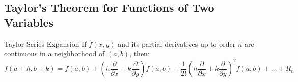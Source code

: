 \documentclass[11pt,a4paper]{article}
\begin{document}
\subsection{Taylor's Theorem for Functions of Two Variables}

\begin{defbox}{Taylor Series Expansion}
If $f(x,y)$ and its partial derivatives up to order $n$ are continuous in a neighborhood of $(a,b)$, then:
\begin{equation}
    f(a+h, b+k) = f(a,b) + \left( h \frac{\partial}{\partial x} + k \frac{\partial}{\partial y} \right) f(a,b) + \frac{1}{2!} \left( h \frac{\partial}{\partial x} + k \frac{\partial}{\partial y} \right)^2 f(a,b) + \dots + R_n
\end{equation}
\end{defbox}
\end{document}
